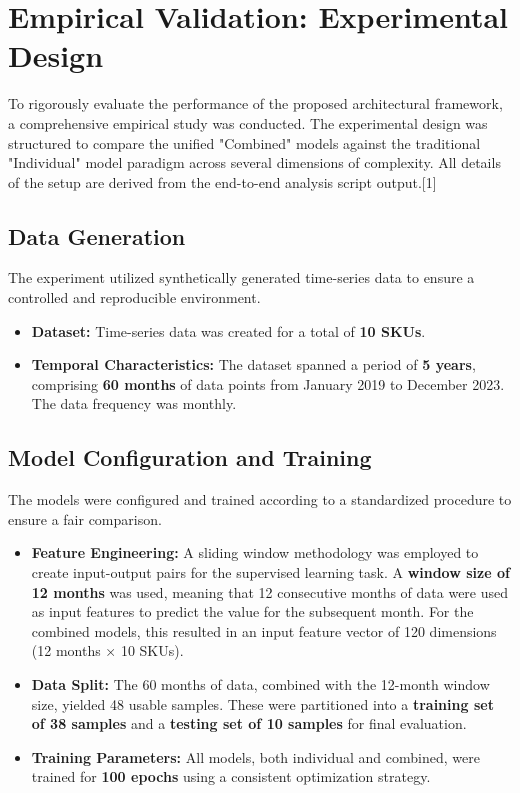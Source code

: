 \documentclass{article}
\begin{document}
\section{Empirical Validation: Experimental Design}

To rigorously evaluate the performance of the proposed architectural framework, a comprehensive empirical study was conducted. The experimental design was structured to compare the unified "Combined" models against the traditional "Individual" model paradigm across several dimensions of complexity. All details of the setup are derived from the end-to-end analysis script output.[1]

\subsection{Data Generation}
The experiment utilized synthetically generated time-series data to ensure a controlled and reproducible environment.
\begin{itemize}
    \item \textbf{Dataset:} Time-series data was created for a total of \textbf{10 SKUs}.
    \item \textbf{Temporal Characteristics:} The dataset spanned a period of \textbf{5 years}, comprising \textbf{60 months} of data points from January 2019 to December 2023. The data frequency was monthly.
\end{itemize}

\subsection{Model Configuration and Training}
The models were configured and trained according to a standardized procedure to ensure a fair comparison.
\begin{itemize}
    \item \textbf{Feature Engineering:} A sliding window methodology was employed to create input-output pairs for the supervised learning task. A \textbf{window size of 12 months} was used, meaning that 12 consecutive months of data were used as input features to predict the value for the subsequent month. For the combined models, this resulted in an input feature vector of 120 dimensions (12 months × 10 SKUs).
    \item \textbf{Data Split:} The 60 months of data, combined with the 12-month window size, yielded 48 usable samples. These were partitioned into a \textbf{training set of 38 samples} and a \textbf{testing set of 10 samples} for final evaluation.
    \item \textbf{Training Parameters:} All models, both individual and combined, were trained for \textbf{100 epochs} using a consistent optimization strategy.
\end{itemize}
\end{document}
